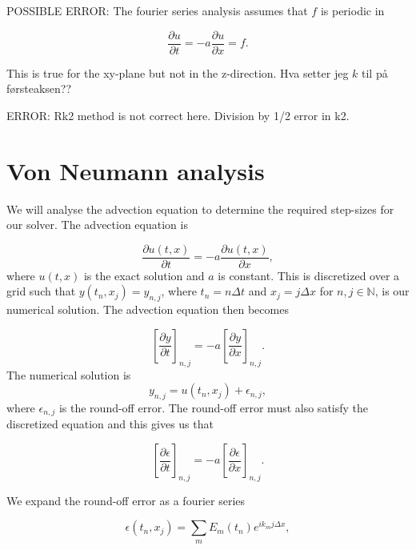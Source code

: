 \documentclass{article}
\begin{document}
POSSIBLE ERROR: The fourier series analysis assumes that $f$ is periodic in 

\begin{equation*}
    \frac{\partial u}{\partial t} = -a \frac{\partial u}{\partial x}=f.
\end{equation*}

This is true for the xy-plane but not in the z-direction. Hva setter jeg $k$ til på førsteaksen??

ERROR: Rk2 method is not correct here. Division by 1/2 error in k2.

\section{Von Neumann analysis}

We will analyse the advection equation to determine the required step-sizes for our solver. The advection equation is

\begin{equation}
    \frac{\partial u(t,x)}{\partial t} = -a \frac{\partial u(t,x)}{\partial x},
\end{equation}
where $u(t,x)$ is the exact solution and $a$ is constant. This is discretized over a grid such that $y(t_n,x_j)=y_{n,j}$, where $t_n = n\Delta t$ and $x_j = j\Delta x$ for $n,j\in\mathbb{N}$, is our numerical solution. The advection equation then becomes

\begin{equation}
    \left[\frac{\partial y}{\partial t}\right]_{n,j} = -a \left[\frac{\partial y}{\partial x}\right]_{n,j}.
\end{equation}
The numerical solution is
\begin{equation}
    y_{n,j} = u(t_n,x_j)+\epsilon_{n,j},
\end{equation}
where $\epsilon_{n,j}$ is the round-off error. The round-off error must also satisfy the discretized equation and this gives us that

\begin{equation}\label{eq:advection_error}
    \left[\frac{\partial \epsilon}{\partial t}\right]_{n,j} = -a \left[\frac{\partial \epsilon}{\partial x}\right]_{n,j}.
\end{equation}

We expand the round-off error as a fourier series

\begin{equation}
    \epsilon(t_n,x_j) = \sum_m E_m(t_n) e^{i k_m j\Delta x},
\end{equation}
\end{document}
